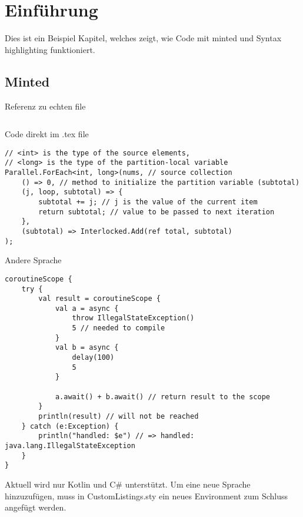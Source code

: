 \chapter{Einführung}
\label{cha:Introduction}

Dies ist ein Beispiel Kapitel, welches zeigt, wie Code mit minted und Syntax highlighting funktioniert.

\section{Minted}


\begin{longlisting}
    \caption{Referenz zu echten file}
    \label{csharp:apm_calc1}
    \inputminted[firstline=7, lastline=44]{csharp}{code/program.cs}
\end{longlisting}


\begin{longlisting}
    \caption{Code direkt im .tex file}
    \label{csharp:TPLThreadLocalForEach}
\begin{verbatim}
// <int> is the type of the source elements,
// <long> is the type of the partition-local variable
Parallel.ForEach<int, long>(nums, // source collection
    () => 0, // method to initialize the partition variable (subtotal)
    (j, loop, subtotal) => { 
        subtotal += j; // j is the value of the current item
        return subtotal; // value to be passed to next iteration
    },
    (subtotal) => Interlocked.Add(ref total, subtotal) 
);
\end{verbatim}
\end{longlisting}

\begin{longlisting}
    \caption{Andere Sprache}
    \label{kotlin:tryCatchAsyncWithScope}
\begin{verbatim}
coroutineScope {
    try {
        val result = coroutineScope {
            val a = async { 
                throw IllegalStateException()
                5 // needed to compile
            }
            val b = async { 
                delay(100)
                5 
            }

            a.await() + b.await() // return result to the scope
        }
        println(result) // will not be reached
    } catch (e:Exception) {
        println("handled: $e") // => handled: java.lang.IllegalStateException
    }
}
\end{verbatim}
\end{longlisting}

Aktuell wird nur Kotlin und C\# unterstützt. Um eine neue Sprache hinzuzufügen, muss in CustomListings.sty ein neues Environment zum Schluss angefügt werden.




